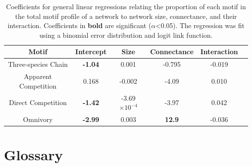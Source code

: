 \documentclass[12pt]{article}
\begin{document}
\begin{spacing}{2.0}
    
    
         \begin{table}[hb!]
            \centering
            \caption{Coefficients for general linear regressions relating the proportion of each motif in the total motif profile of a network to network size, connectance, and their interaction. Coefficients in \textbf{bold} are significant ($\alpha$\textless0.05). The regression was fit using a binomial error distribution and logit link function.}
           \label{network_prop_lms}
           \begin{tabular}{c|c c c c c}
                Motif & Intercept & Size & Connectance & Interaction \\
                \hline
                Three-species Chain & \textbf{-1.04} & 0.001 & -0.795 & -0.019 \\
                Apparent Competition & 0.168 & -0.002 & -4.09 & 0.010 \\
                Direct Competition & \textbf{-1.42} & -3.69$\times10^{-4}$ & -3.97 & 0.042 \\
                Omnivory & \textbf{-2.99} & 0.003 & \textbf{12.9} & -0.036\\
                \hline
                \end{tabular}
        \end{table}        
\clearpage
    
            




\clearpage

\section{Glossary}


\end{spacing}
\end{document}
